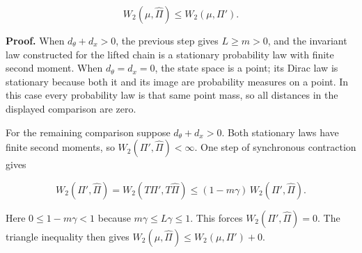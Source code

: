 \documentclass[11pt,a4paper]{article}
\begin{document}
\[W_2(\mu,\widehat\Pi)\le W_2(\mu,\Pi').\]

\textbf{Proof.} When \(d_\theta+d_x>0\), the previous step gives \(L\ge m>0\), and the invariant law constructed for the lifted chain is a stationary probability law with finite second moment. When \(d_\theta=d_x=0\), the state space is a point; its Dirac law is stationary because both it and its image are probability measures on a point. In this case every probability law is that same point mass, so all distances in the displayed comparison are zero.



For the remaining comparison suppose \(d_\theta+d_x>0\). Both stationary laws have finite second moments, so \(W_2(\Pi',\widehat\Pi)<\infty\). One step of synchronous contraction gives

\[W_2(\Pi',\widehat\Pi)=W_2(T\Pi',T\widehat\Pi)\le(1-m\gamma)\,W_2(\Pi',\widehat\Pi).\]

Here \(0\le1-m\gamma<1\) because \(m\gamma\le L\gamma\le1\). This forces \(W_2(\Pi',\widehat\Pi)=0\). The triangle inequality then gives \(W_2(\mu,\widehat\Pi)\le W_2(\mu,\Pi')+0\).
\end{document}
